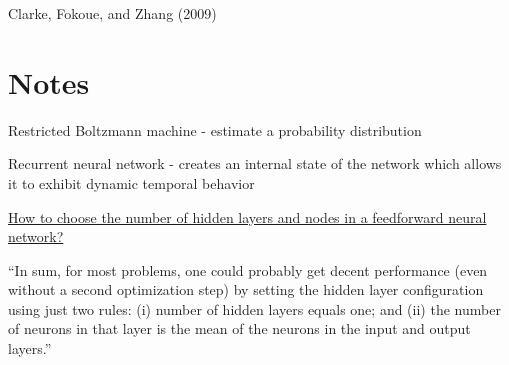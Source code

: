 \documentclass[10pt]{amsart}
\begin{document}
\begin{multicols*}{2}
Clarke, Fokoue, and Zhang (2009) \cite{CFZ2009}


\part{Notes}


Restricted Boltzmann machine - estimate a probability distribution

Recurrent neural network - creates an internal state of the network which allows it to exhibit dynamic temporal behavior


\href{http://stats.stackexchange.com/questions/181/how-to-choose-the-number-of-hidden-layers-and-nodes-in-a-feedforward-neural-netw}{How to choose the number of hidden layers and nodes in a feedforward neural network?}

``In sum, for most problems, one could probably get decent performance (even without a second optimization step) by setting the hidden layer configuration using just two rules: (i) number of hidden layers equals one; and (ii) the number of neurons in that layer is the mean of the neurons in the input and output layers.''





\end{multicols*}
\end{document}
